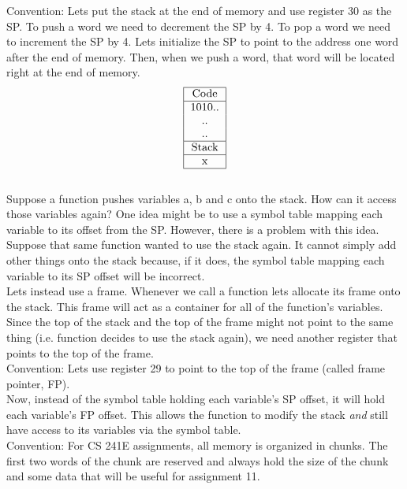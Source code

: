 \documentclass[12pt, letterpaper]{article}
\begin{document}
Convention: Lets put the stack at the end of memory and use register 30 as the SP.
To push a word we need to decrement the SP by 4. To pop a word we need to increment the SP by 4.
Lets initialize the SP to point to the address one word after the end of memory. Then, when we push a word, that word will be located right at the end of memory.\\

\[
\begin{tabular}{|c|}
\hline
Code\\
\hline
1010..\\
..\\
..\\
\hline
Stack\\
\hline
x\\
\hline
\end{tabular}
\]\\

Suppose a function pushes variables a, b and c onto the stack. How can it access those variables again? One idea might be to use a symbol table mapping each variable to its offset from the SP. However, there is a problem with this idea. Suppose that same function wanted to use the stack again. It cannot simply add other things onto the stack because, if it does, the symbol table mapping each variable to its SP offset will be incorrect.\\

Lets instead use a frame. Whenever we call a function lets allocate its frame onto the stack. This frame will act as a container for all of the function's variables. Since the top of the stack and the top of the frame might not point to the same thing (i.e. function decides to use the stack again), we need another register that points to the top of the frame.\\

Convention: Lets use register 29 to point to the top of the frame (called frame pointer, FP).\\

Now, instead of the symbol table holding each variable's SP offset, it will hold each variable's FP offset. This allows the function to modify the stack \emph{and} still have access to its variables via the symbol table.\\

Convention: For CS 241E assignments, all memory is organized in chunks. The first two words of the chunk are reserved and always hold the size of the chunk and some data that will be useful for assignment 11.
\end{document}
